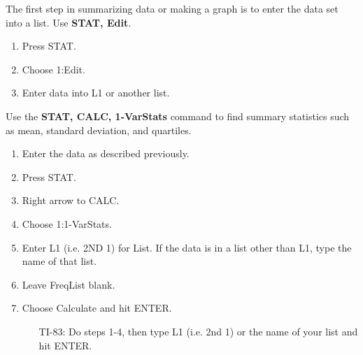 
\begin{termBox}{
The first step in summarizing data or making a graph is to  enter the data set into a list.  Use \textbf{STAT, Edit}.
\begin{enumerate}
\item Press STAT.
\item Choose 1:Edit.
\item Enter data into L1 or another list.
\end{enumerate}
}
\end{termBox}

\begin{termBox}{
Use the \textbf{STAT, CALC, 1-VarStats} command to find summary statistics such as mean, standard deviation, and quartiles.  
\begin{enumerate}
\item Enter the data as described previously.
\item Press STAT.
\item Right arrow to CALC.
\item Choose 1:1-VarStats.
\item Enter L1 (i.e. 2ND 1) for List.  If the data is in a list other than L1, type the name of that list.   
\item Leave FreqList blank.
\item Choose Calculate and hit ENTER.
\newline
\begin{itemize}
\item[TI-83: ] Do steps 1-4, then type L1 (i.e. 2nd 1) or the name of your list and hit ENTER.
\end{itemize}
\end{enumerate}
}
\end{termBox}


